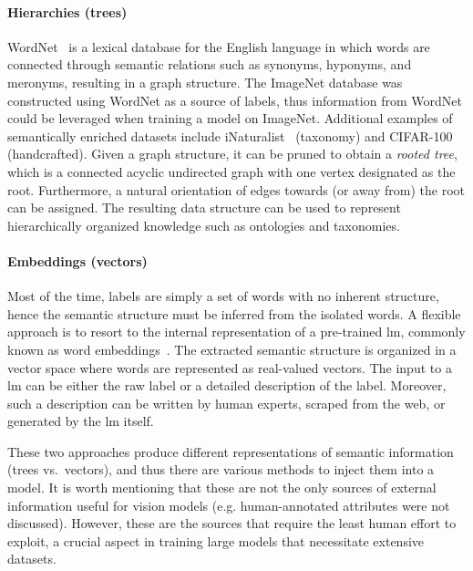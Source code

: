 \paragraph{Hierarchies (trees)}
\label{par:hierarchies-tree}
WordNet~\cite{WordnetMi1995} is a lexical database for the English language in which words are connected through semantic relations such as synonyms, hyponyms, and meronyms, resulting in a graph structure. The ImageNet database was constructed using WordNet as a source of labels, thus information from WordNet could be leveraged when training a model on ImageNet. Additional examples of semantically enriched datasets include iNaturalist~\cite{TheInaturalistHorn2017} (taxonomy) and CIFAR-100~\cite{LearningMultipKrizhe2009} (handcrafted). Given a graph structure, it can be pruned to obtain a \emph{rooted tree}, which is a connected acyclic undirected graph with one vertex designated as the root. Furthermore, a natural orientation of edges towards (or away from) the root can be assigned. The resulting data structure can be used to represent hierarchically organized knowledge such as ontologies and taxonomies.

\paragraph{Embeddings (vectors)}
\label{par:embeddings-vectors}
Most of the time, labels are simply a set of words with no inherent structure, hence the semantic structure must be inferred from the isolated words. A flexible approach is to resort to the internal representation of a pre-trained \acrfull{lm}, commonly known as word embeddings~\cite{BeyondWordEmbIncitt2023}. The extracted semantic structure is organized in a vector space where words are represented as real-valued vectors. The input to a \acrshort{lm} can be either the raw label or a detailed description of the label. Moreover, such a description can be written by human experts, scraped from the web, or generated by the \acrshort{lm} itself.\medskip

These two approaches produce different representations of semantic information (trees vs.\ vectors), and thus there are various methods to inject them into a model.
It is worth mentioning that these are not the only sources of external information useful for vision models (e.g. human-annotated attributes were not discussed). However, these are the sources that require the least human effort to exploit, a crucial aspect in training large models that necessitate extensive datasets.

